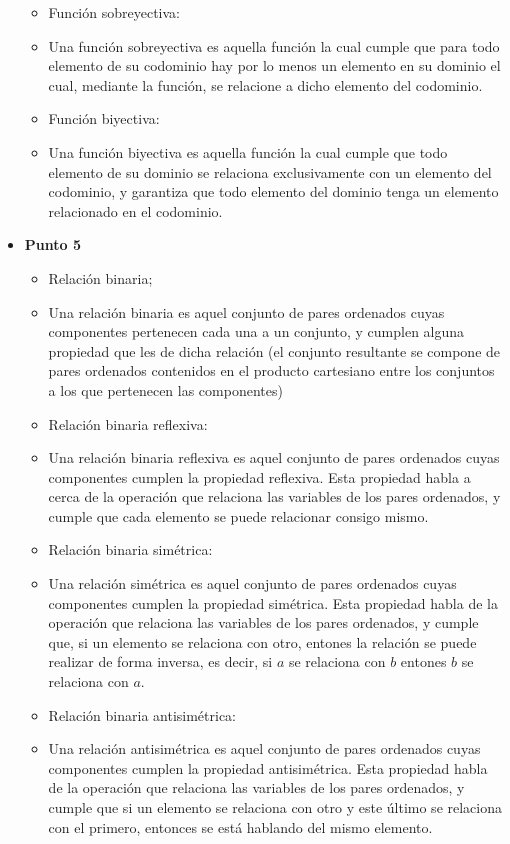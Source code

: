 \documentclass{article}
\begin{document}
\begin{itemize}
\begin{itemize}
			\item Función sobreyectiva:
			\item [] Una función sobreyectiva es aquella función la cual cumple que para todo elemento de su codominio hay por lo menos un elemento en su dominio el cual, mediante la función, se relacione a dicho elemento del codominio.
			\item Función biyectiva:
			\item [] Una función biyectiva es aquella función la cual cumple que todo elemento de su dominio se relaciona exclusivamente con un elemento del codominio, y garantiza que todo elemento del dominio tenga un elemento relacionado en el codominio.
		\end{itemize}
	\item [] \textbf{Punto 5}
	      \begin{itemize}
		      \item Relación binaria;
		      \item [] Una relación binaria es aquel conjunto de pares ordenados cuyas componentes pertenecen cada una a un conjunto, y cumplen alguna propiedad que les de dicha relación (el conjunto resultante se compone de pares ordenados contenidos en el producto cartesiano entre los conjuntos a los que pertenecen las componentes)
		      \item Relación binaria reflexiva:
		      \item [] Una relación binaria reflexiva es aquel conjunto de pares ordenados cuyas componentes cumplen la propiedad reflexiva. Esta propiedad habla a cerca de la operación que relaciona las variables de los pares ordenados, y cumple que cada elemento se puede relacionar consigo mismo.
		      \item Relación binaria simétrica:
		      \item [] Una relación simétrica es aquel conjunto de pares ordenados cuyas componentes cumplen la propiedad simétrica. Esta propiedad habla de la operación que relaciona las variables de los pares ordenados, y cumple que, si un elemento se relaciona con otro, entones la relación se puede realizar de forma inversa, es decir, si $a$ se relaciona con $b$ entones $b$ se relaciona con $a$.
		      \item Relación binaria antisimétrica:
		      \item [] Una relación antisimétrica es aquel conjunto de pares ordenados cuyas componentes cumplen la propiedad antisimétrica. Esta propiedad habla de la operación que relaciona las variables de los pares ordenados, y cumple que si un elemento se relaciona con otro y este último se relaciona con el primero, entonces se está hablando del mismo elemento.

\end{itemize}
\end{itemize}
\end{document}
